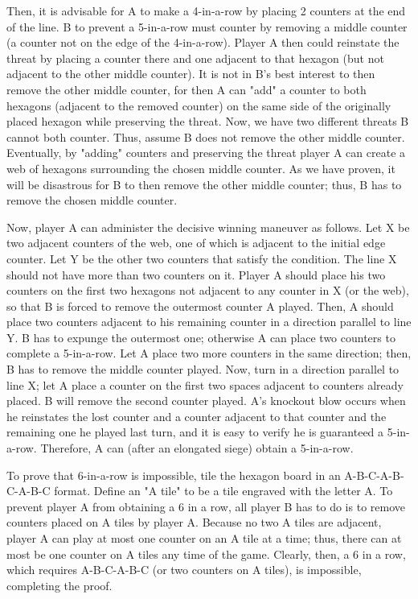 \begin{enumerate}
 Then, it is advisable for A to make a 4-in-a-row by placing 2 counters at the end of the line. B to prevent a 5-in-a-row must counter by removing a middle counter (a counter not on the edge of the 4-in-a-row). Player A then could reinstate the threat by placing a counter there and one adjacent to that hexagon (but not adjacent to the other middle counter). It is not in B's best interest to then remove the other middle counter, for then A can "add" a counter to both hexagons (adjacent to the removed counter) on the same side of the originally placed hexagon while preserving the threat. Now, we have two different threats B cannot both counter. Thus, assume B does not remove the other middle counter. Eventually, by "adding" counters and preserving the threat player A can create a web of hexagons surrounding the chosen middle counter. As we have proven, it will be disastrous for B to then remove the other middle counter; thus, B has to remove the chosen middle counter.

 Now, player A can administer the decisive winning maneuver as follows. Let X be two adjacent counters of the web, one of which is adjacent to the initial edge counter. Let Y be the other two counters that satisfy the condition. The line X should not have more than two counters on it. Player A should place his two counters on the first two hexagons not adjacent to any counter in X (or the web), so that B is forced to remove the outermost counter A played. Then, A should place two counters adjacent to his remaining counter in a direction parallel to line Y. B has to expunge the outermost one; otherwise A can place two counters to complete a 5-in-a-row. Let A place two more counters in the same direction; then, B has to remove the middle counter played. Now, turn in a direction parallel to line X; let A place a counter on the first two spaces adjacent to counters already placed. B will remove the second counter played. A's knockout blow occurs when he reinstates the lost counter and a counter adjacent to that counter and the remaining one he played last turn, and it is easy to verify he is guaranteed a 5-in-a-row. Therefore, A can (after an elongated siege) obtain a 5-in-a-row.

 To prove that 6-in-a-row is impossible, tile the hexagon board in an A-B-C-A-B-C-A-B-C format. Define an "A tile" to be a tile engraved with the letter A. To prevent player A from obtaining a 6 in a row, all player B has to do is to remove counters placed on A tiles by player A. Because no two A tiles are adjacent, player A can play at most one counter on an A tile at a time; thus, there can at most be one counter on A tiles any time of the game. Clearly, then, a 6 in a row, which requires A-B-C-A-B-C (or two counters on A tiles), is impossible, completing the proof.


\end{enumerate}

